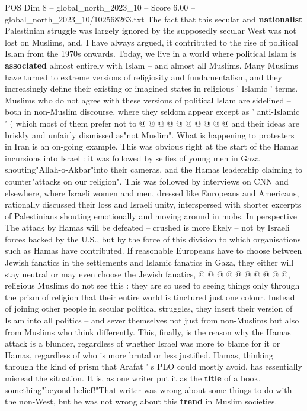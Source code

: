 \begin{textsample}{POS Dim 8 – global\_north\_2023\_10 – Score 6.00 – global\_north\_2023\_10/102568263.txt}
The fact that this secular and \textbf{nationalist} Palestinian struggle was largely ignored by the supposedly secular West was not lost on Muslims, and, I have always argued, it contributed to the rise of political Islam from the 1970s onwards.
Today, we live in a world where political Islam is \textbf{associated} almost entirely with Islam -- and almost all Muslims.
Many Muslims have turned to extreme versions of religiosity and fundamentalism, and they increasingly define their existing or imagined states in religious ' Islamic ' terms.
Muslims who do not agree with these versions of political Islam are sidelined -- both in non-Muslim discourse, where they seldom appear except as ' anti-Islamic ' ( which most of them prefer not to @ @ @ @ @ @ @ @ @ @ and their ideas are briskly and unfairly dismissed as"not Muslim".
What is happening to protesters in Iran is an on-going example.
This was obvious right at the start of the Hamas incursions into Israel : it was followed by selfies of young men in Gaza shouting"Allah-o-Akbar"into their cameras, and the Hamas leadership claiming to counter"attacks on our religion".
This was followed by interviews on CNN and elsewhere, where Israeli women and men, dressed like Europeans and Americans, rationally discussed their loss and Israeli unity, interspersed with shorter excerpts of Palestinians shouting emotionally and moving around in mobs.
In perspective The attack by Hamas will be defeated -- crushed is more likely -- not by Israeli forces backed by the U.S., but by the force of this division to which organisations such as Hamas have contributed.
If reasonable Europeans have to choose between Jewish fanatics in the settlements and Islamic fanatics in Gaza, they either will stay neutral or may even choose the Jewish fanatics, @ @ @ @ @ @ @ @ @ @, religious Muslims do not see this : they are so used to seeing things only through the prism of religion that their entire world is tinctured just one colour.
Instead of joining other people in secular political struggles, they insert their version of Islam into all politics -- and sever themselves not just from non-Muslims but also from Muslims who think differently.
This, finally, is the reason why the Hamas attack is a blunder, regardless of whether Israel was more to blame for it or Hamas, regardless of who is more brutal or less justified.
Hamas, thinking through the kind of prism that Arafat ' s PLO could mostly avoid, has essentially misread the situation.
It is, as one writer put it as the \textbf{title} of a book, something"beyond belief!"That writer was wrong about some things to do with the non-West, but he was not wrong about this \textbf{trend} in Muslim societies.

\end{textsample}
